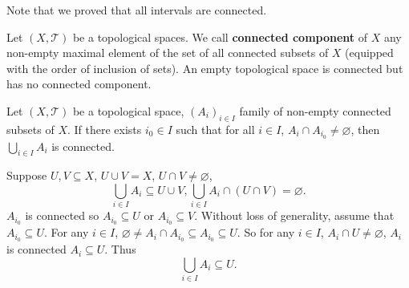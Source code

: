 \begin{remark}
    Note that we proved that all intervals are connected.
\end{remark}

\begin{definitionenv}
    Let $(X,\mathscr{T})$ be a topological spaces.
    We call \textbf{connected component} of $X$ any non-empty maximal element of the set of all connected subsets of $X$ (equipped with the order of inclusion of sets).
    An empty topological space is connected but has no connected component.
\end{definitionenv}

\begin{lemmaenv}\label{thm:IsConnected.biUnion_of_reflTransGen}
    Let $(X,\mathscr{T})$ be a topological space, $\left(A_i\right)_{i\in I}$ family of non-empty connected subsets of $X$.
    If there exists $i_0 \in I$ such that for all $i \in I$, $A_{i} \cap A_{i_0} \neq \varnothing$, then $\bigcup_{i\in I}A_i$ is connected.
\end{lemmaenv}
\begin{proofenv}
    Suppose $U,V \subseteq X$, $U \cup V = X$, $U \cap V \neq \varnothing$,
    $$ \bigcup_{i\in I} A_i \subseteq U \cup V, \bigcup_{i\in I}A_i \cap \left(U \cap V\right) = \varnothing.$$
    $A_{i_0}$ is connected so $A_{i_0} \subseteq U$ or $A_{i_0} \subseteq V$.
    Without loss of generality, assume that $A_{i_0} \subseteq U$.
    For any $i \in I$, $\varnothing \neq A_i\cap A_{i_0} \subseteq A_{i_0} \subseteq U$.
    So for any $i \in I$, $A_i\cap U \neq \varnothing$, $A_i$ is connected $A_i \subseteq U$.
    Thus 
    $$ \bigcup_{i\in I}A_i \subseteq U.$$
\end{proofenv}

